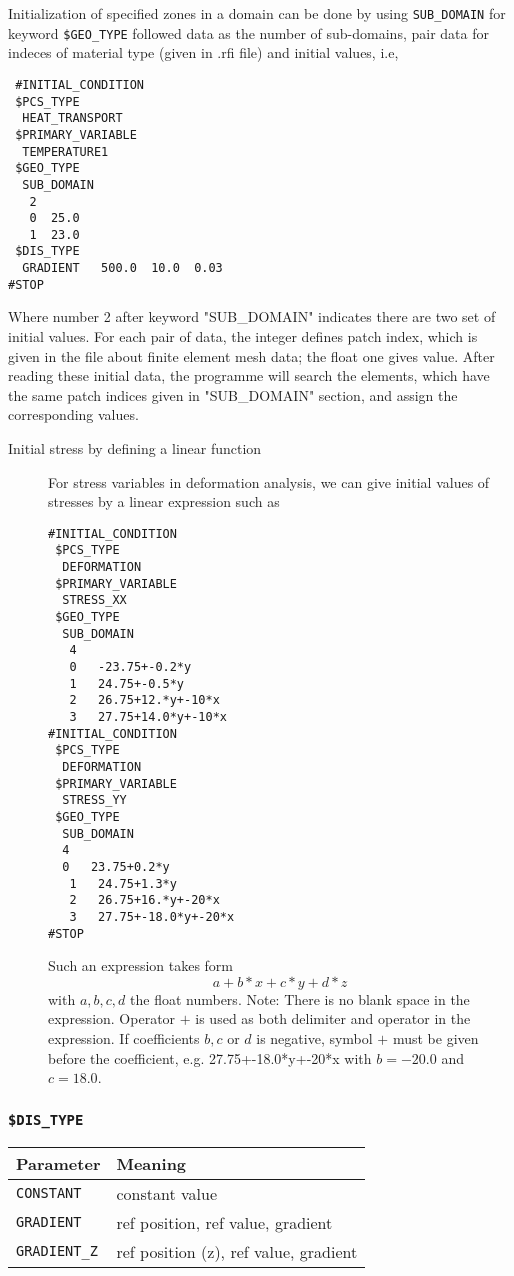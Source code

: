 Initialization of specified zones in a domain can be done by using
 \texttt{SUB\_DOMAIN} for keyword \texttt{\$GEO\_TYPE} followed data
 as the number of sub-domains, pair data for indeces of material
 type (given in .rfi file) and initial values, i.e,
 \begin{verbatim}
 #INITIAL_CONDITION
 $PCS_TYPE
  HEAT_TRANSPORT
 $PRIMARY_VARIABLE
  TEMPERATURE1
 $GEO_TYPE
  SUB_DOMAIN
   2
   0  25.0
   1  23.0
 $DIS_TYPE
  GRADIENT   500.0  10.0  0.03
#STOP
\end{verbatim}
Where number 2 after keyword "SUB\_DOMAIN" indicates there are two set of initial values. For each pair of data,
 the integer defines patch index, which is given in the file about finite element mesh data; the float one gives
 value.  After reading these initial data, the programme will search the elements, which have the same patch
  indices given in "SUB\_DOMAIN" section, and assign the corresponding values.
\begin{description}
  \item[Initial stress by defining a linear function]
   For stress variables in deformation analysis, we can give initial values of stresses by a linear expression such as
 \begin{verbatim}
#INITIAL_CONDITION
 $PCS_TYPE
  DEFORMATION
 $PRIMARY_VARIABLE
  STRESS_XX
 $GEO_TYPE
  SUB_DOMAIN
   4
   0   -23.75+-0.2*y
   1   24.75+-0.5*y
   2   26.75+12.*y+-10*x
   3   27.75+14.0*y+-10*x
#INITIAL_CONDITION
 $PCS_TYPE
  DEFORMATION
 $PRIMARY_VARIABLE
  STRESS_YY
 $GEO_TYPE
  SUB_DOMAIN
  4
  0   23.75+0.2*y
   1   24.75+1.3*y
   2   26.75+16.*y+-20*x
   3   27.75+-18.0*y+-20*x
#STOP
\end{verbatim}
Such an expression takes form
\[a+b*x+c*y+d*z\] with $a,b,c,d$ the float numbers. Note: There is no blank space in the expression.
Operator $+$ is used as both delimiter and operator in the expression. If coefficients $b,c$ or $d$ is negative,
symbol $+$ must be given before the coefficient, e.g. 27.75+-18.0*y+-20*x with $b=-20.0$ and $c=18.0$.
\end{description}

\subsubsection{\texttt{\$DIS\_TYPE}}

\begin{tabular*}{12.773cm}{|p{}|p{8.9cm}|} \hline
Parameter          & Meaning \\ \hline \hline
%
\texttt{CONSTANT}  & constant value \\
\texttt{GRADIENT}  & ref position, ref value, gradient \\
\texttt{GRADIENT\_Z}  & ref position (z), ref value, gradient \\
\hline
\end{tabular*}

